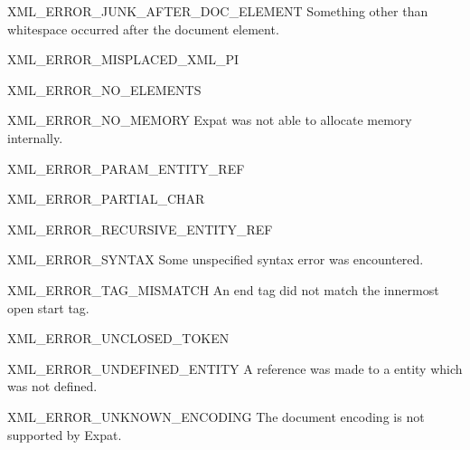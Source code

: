 \begin{datadesc}{XML_ERROR_JUNK_AFTER_DOC_ELEMENT}
Something other than whitespace occurred after the document element.
\end{datadesc}

\begin{datadesc}{XML_ERROR_MISPLACED_XML_PI}
\end{datadesc}

\begin{datadesc}{XML_ERROR_NO_ELEMENTS}
\end{datadesc}

\begin{datadesc}{XML_ERROR_NO_MEMORY}
Expat was not able to allocate memory internally.
\end{datadesc}

\begin{datadesc}{XML_ERROR_PARAM_ENTITY_REF}
\end{datadesc}

\begin{datadesc}{XML_ERROR_PARTIAL_CHAR}
\end{datadesc}

\begin{datadesc}{XML_ERROR_RECURSIVE_ENTITY_REF}
\end{datadesc}

\begin{datadesc}{XML_ERROR_SYNTAX}
Some unspecified syntax error was encountered.
\end{datadesc}

\begin{datadesc}{XML_ERROR_TAG_MISMATCH}
An end tag did not match the innermost open start tag.
\end{datadesc}

\begin{datadesc}{XML_ERROR_UNCLOSED_TOKEN}
\end{datadesc}

\begin{datadesc}{XML_ERROR_UNDEFINED_ENTITY}
A reference was made to a entity which was not defined.
\end{datadesc}

\begin{datadesc}{XML_ERROR_UNKNOWN_ENCODING}
The document encoding is not supported by Expat.
\end{datadesc}

